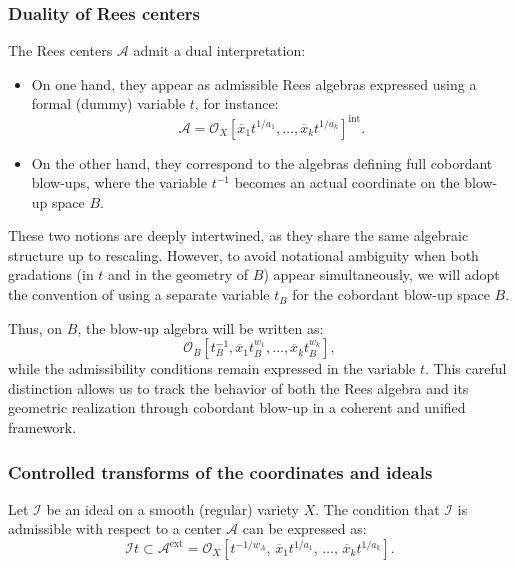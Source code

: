 \documentclass{amsart}
\newcommand{\ext}{{\operatorname{ext}}}
\begin{document}
\subsubsection{Duality of Rees centers}

The Rees centers \( \mathcal{A} \) admit a dual interpretation:

\begin{itemize}
    \item On one hand, they appear as admissible Rees algebras expressed using a formal (dummy) variable \( t \), for instance:
    \[
    \mathcal{A} = \mathcal{O}_X[\overline{x}_1 t^{1/a_1}, \ldots, \overline{x}_k t^{1/a_k}]^{\mathrm{int}}.
    \]
    
    \item On the other hand, they correspond to the algebras defining full cobordant blow-ups, where the variable \( t^{-1} \) becomes an actual coordinate on the blow-up space \( B \).
\end{itemize}

These two notions are deeply intertwined, as they share the same algebraic structure up to rescaling. However, to avoid notational ambiguity when both gradations (in \( t \) and in the geometry of \( B \)) appear simultaneously, we will adopt the convention of using a separate variable \( t_B \) for the cobordant blow-up space \( B \).

Thus, on \( B \), the blow-up algebra will be written as:
\[
\mathcal{O}_B[t_B^{-1}, \overline{x}_1 t_B^{w_1}, \ldots, \overline{x}_k t_B^{w_k}],
\]
while the admissibility conditions remain expressed in the variable \( t \). This careful distinction allows us to track the behavior of both the Rees algebra and its geometric realization through cobordant blow-up in a coherent and unified framework.
\subsubsection{Controlled transforms of the coordinates and ideals} \label{control3} \cite{ATW-weighted}

Let $\mathcal{I}$ be an ideal on a smooth (regular) variety $X$. The condition that $\mathcal{I}$ is admissible with respect to a center $\mathcal{A}$ can be expressed as:
\[
\mathcal{I} t \subset \mathcal{A}^\ext = \mathcal{O}_X\left[t^{-1/w_A},\, \overline{x}_1 t^{1/a_1},\, \ldots,\, \overline{x}_k t^{1/a_k}\right].
\]
\end{document}
